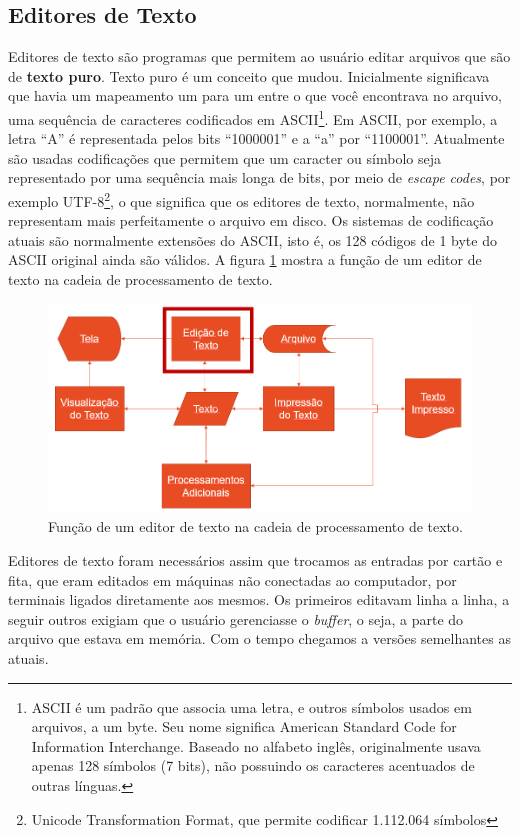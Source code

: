 \subsection{Editores de Texto}

Editores de texto são programas que permitem ao usuário editar arquivos que são de \textbf{texto puro}. Texto puro é um conceito que mudou. Inicialmente significava que havia um mapeamento um para um entre o que você encontrava no arquivo, uma sequência de caracteres codificados em ASCII\footnote{ASCII é um padrão que associa uma letra, e outros símbolos usados em arquivos, a um byte. Seu nome significa American Standard Code for Information Interchange. Baseado no alfabeto inglês, originalmente usava apenas 128 símbolos (7 bits), não possuindo os caracteres acentuados de outras línguas.}. Em ASCII, por exemplo, a letra \enquote{A} é representada pelos bits \enquote{1000001} e a \enquote{a} por \enquote{1100001}. Atualmente são usadas codificações que permitem que um caracter ou símbolo seja representado por uma sequência mais longa de bits, por meio de \textit{escape codes}, por exemplo UTF-8\footnote{Unicode Transformation Format, que permite codificar 1.112.064 símbolos}, o que significa que os editores de texto, normalmente, não representam mais perfeitamente o arquivo em disco. Os sistemas de codificação atuais são normalmente extensões do ASCII, isto é, os 128 códigos de 1 byte do ASCII original ainda são válidos. A figura \ref{fig:funedtexto} mostra a função de um editor de texto na cadeia de processamento de texto.

\begin{figure}[hbt]
    \centering
    \includegraphics[width=0.7\linewidth]{Images/editordetexto}
    \caption[Função de um editor de texto]{Função de um editor de texto na cadeia de processamento de texto.}
    \label{fig:funedtexto}
\end{figure}



Editores de texto foram necessários assim que trocamos as entradas por cartão e fita, que eram editados em máquinas não conectadas ao computador, por terminais ligados diretamente aos mesmos. Os primeiros editavam linha a linha, a seguir outros exigiam que o usuário gerenciasse o \textit{buffer}, o seja, a parte do arquivo que estava em memória. Com o tempo chegamos a versões semelhantes as atuais.

